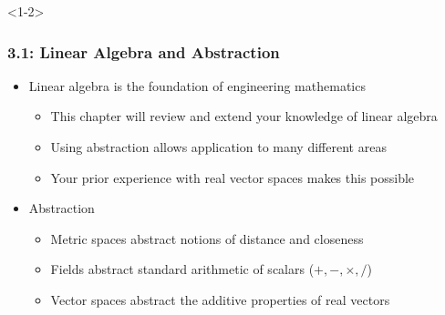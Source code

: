 \documentclass[10pt,english,aspectratio=169]{beamer}
\begin{document}
\begin{frame}<1-2> \frametitle{3.1: Linear Algebra and Abstraction}

\begin{itemize}
\setlength\itemsep{5mm}
\item<1-> Linear algebra is the foundation of engineering mathematics \vspace{1mm}
  \begin{itemize}
  \setlength\itemsep{1.5mm}
  \item This chapter will review and extend your knowledge of linear algebra
  \item Using abstraction allows application to many different areas
  \item Your prior experience with real vector spaces makes this possible 
  \end{itemize}
\item<2-> Abstraction \vspace{1mm}
  \begin{itemize}
  \setlength\itemsep{1.5mm}
  \item Metric spaces abstract notions of distance and closeness
  \item Fields abstract standard arithmetic of scalars ($+,-,\times,/$)
  \item Vector spaces abstract the additive properties of real vectors
  \end{itemize}
\end{itemize}


\end{frame}
\end{document}

